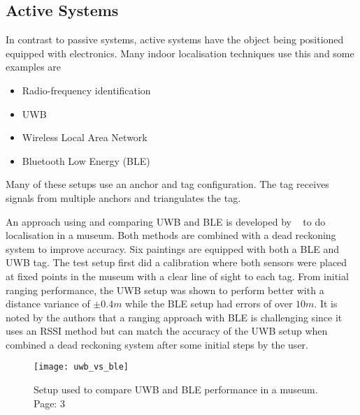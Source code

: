 \subsection{Active Systems}
In contrast to passive systems, active systems have the object being positioned equipped with electronics.
Many indoor localisation techniques use this and some examples are ~\citep{deak2012survey}
\begin{itemize}
    \item Radio-frequency identification
    \item UWB
    \item Wireless Local Area Network
    \item Bluetooth Low Energy (BLE)
\end{itemize}
Many of these setups use an anchor and tag configuration.
The tag receives signals from multiple anchors and triangulates the tag.

An approach using and comparing UWB and BLE is developed by ~\cite{findobjs} to do localisation in a museum.
Both methods are combined with a dead reckoning system to improve accuracy.
Six paintings are equipped with both a BLE and UWB tag.
The test setup first did a calibration where both sensors were placed at fixed points in the museum with a clear line of sight to each tag.
From initial ranging performance, the UWB setup was shown to perform better with a distance variance of $\pm0.4m$ while the BLE setup had errors of over $10m$.
It is noted by the authors that a ranging approach with BLE is challenging since it uses an RSSI method but can match the accuracy of the UWB setup when combined a dead reckoning system after some initial steps by the user.

\begin{figure}[h!]
    \centering
    \texttt{[image: uwb\_vs\_ble]}
    \caption{Setup used to compare UWB and BLE performance in a museum. \cite{findobjs} Page: 3}
    \label{fig:uwbvsble}
\end{figure}


